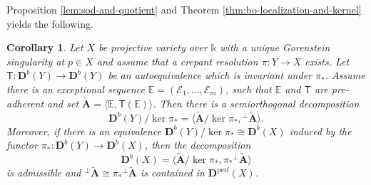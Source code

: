 \documentclass[a4paper,11pt, reqno]{amsart}
\def\E{\mathbb E}
\def\AA{\mathbf A}
\def\DD{\mathbf D}
\def\sE{\mathscr{E}}
\def\Db{\DD^b}
\def\Dperf{\DD^{\mathrm{perf}}}
\newcommand{\bT}{\mathsf{T}}
\theoremstyle{plain}
\newtheorem{corollary}[dummy]{Corollary}
\theoremstyle{definition}
\numberwithin{equation}{section}
\begin{document}
Proposition \ref{lem:sod-and-quotient} and Theorem \ref{thm:bo-localization-and-kernel} yields the following.

\begin{corollary}\label{cor:sod-quotient}
Let $X$ be projective variety over $\mathbb{k}$ with a unique Gorenstein singularity at $p\in X$ and assume that a crepant resolution $\pi\colon Y \to X$ exists. 
Let $\bT \colon \Db( Y ) \to \Db ( Y )$ be an autoequivalence which is invariant under $\pi_\ast$.
Assume there is an exceptional sequence $\E = ( \sE_1, \ldots, \sE_{m} )$, such that $\E$ and $\bT$ are pre-adherent and set $\tilde{\AA}=\langle \E, \bT ( \E ) \rangle$.
Then there is a semiorthogonal decomposition
\begin{equation}\label{eq:sod-quot1}
    \Db (Y) /\ker \pi_\ast = \langle \tilde{\AA} / \ker \pi_* ,  {^{\perp}\tilde{\AA}} \rangle  .
\end{equation}
Moreover, if there is an equivalence $\Db (Y) /\ker \pi_\ast \cong \Db(X)$ induced by the functor $\pi_\ast \colon \Db(Y) \to \Db(X)$, then the decomposition
\begin{equation}\label{eq:sod-quot2}
    \Db (X) = \langle \tilde{\AA} / \ker \pi_* ,  \pi_\ast {^{\perp}\tilde{\AA}} \rangle 
\end{equation}
is admissible and ${^{\perp}\tilde{\AA}} \cong \pi_\ast {^{\perp}\tilde{\AA}}$
is contained in $ \Dperf(X)$.
\end{corollary}
\end{document}
